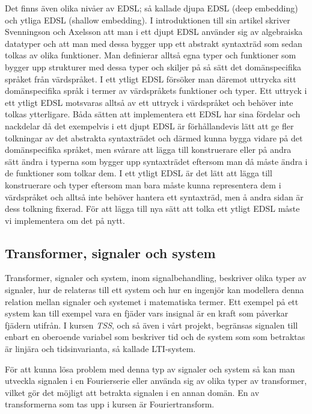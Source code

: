 \documentclass[12pt,a4paper,twoside,openright]{article}
\begin{document}
Det finns även olika nivåer av EDSL; så kallade djupa EDSL (deep
embedding) och ytliga EDSL (shallow embedding). I introduktionen till
sin artikel skriver Svenningson och Axelsson \cite{Svenningsson2013}
att man i ett djupt EDSL använder sig av algebraiska datatyper och att
man med dessa bygger upp ett abstrakt syntaxträd som sedan tolkas av
olika funktioner. Man definierar alltså egna typer och funktioner som
bygger upp strukturer med dessa typer och skiljer på så sätt det
domänspecifika språket från värdspråket. I ett ytligt EDSL försöker
man däremot uttrycka sitt domänspecifika språk i termer av
värdspråkets funktioner och typer. Ett uttryck i ett ytligt EDSL
motsvaras alltså av ett uttryck i värdspråket och behöver inte tolkas
ytterligare. Båda sätten att implementera ett EDSL har sina fördelar
och nackdelar då det exempelvis i ett djupt EDSL är förhållandevis
lätt att ge fler tolkningar av det abstrakta syntaxträdet och därmed
kunna bygga vidare på det domänspecifika språket, men svårare att
lägga till konstruerare eller på andra sätt ändra i typerna som bygger
upp syntaxträdet eftersom man då måste ändra i de funktioner som
tolkar dem. I ett ytligt EDSL är det lätt att lägga till konstruerare
och typer eftersom man bara måste kunna representera dem i värdspråket
och alltså inte behöver hantera ett syntaxträd, men å andra sidan är
dess tolkning fixerad. För att lägga till nya sätt att tolka ett
ytligt EDSL måste vi implementera om det på nytt.

\subsection{Transformer, signaler och system}
Transformer, signaler och system, inom signalbehandling, beskriver
olika typer av signaler, hur de relateras till ett system och hur en
ingenjör kan modellera denna relation mellan signaler och systemet i
matematiska termer. Ett exempel på ett system kan till exempel vara en
fjäder vars insignal är en kraft som påverkar fjädern utifrån. I
kursen \textit{TSS}, och så även i vårt projekt, begränsas signalen
till enbart en oberoende variabel som beskriver tid och de system som
som betraktas är linjära och tidsinvarianta, så kallade LTI-system.

För att kunna lösa problem med denna typ av signaler och system så kan
man utveckla signalen i en Fourierserie eller använda sig av olika	
typer av transformer, vilket gör det möjligt att betrakta signalen i
en annan domän. %
En av transformerna som tas upp i kursen är Fouriertransform.
\end{document}
